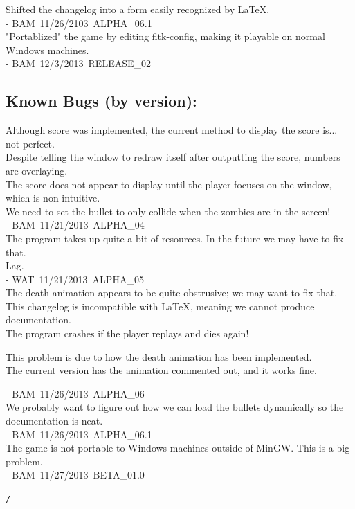 \documentclass[12pt]{article}
\begin{document}
   \noindent
   Shifted the changelog into a form easily recognized by {\LaTeX}. \\
   	- BAM\, 11/26/2103\, ALPHA\_06.1 \\
   
   \noindent
   "Portablized" the game by editing fltk-config, making it playable on normal Windows machines. \\
   	- BAM\, 12/3/2013\, RELEASE\_02 \\
   
   \subsection{Known Bugs (by version):}
   
   Although score was implemented, the current method to display the score is... not perfect. \\
   	Despite telling the window to redraw itself after outputting the score, numbers are overlaying. \\
   	The score does not appear to display until the player focuses on the window, which is non-intuitive. \\
   	We need to set the bullet to only collide when the zombies are in the screen! \\
   	- BAM\, 11/21/2013\, ALPHA\_04 \\
   
   \noindent
   The program takes up quite a bit of resources. In the future we may have to fix that. \\
   	Lag. \\
   	- WAT\, 11/21/2013\, ALPHA\_05 \\
   
   \noindent
   The death animation appears to be quite obstrusive; we may want to fix that. \\
   	This changelog is incompatible with {\LaTeX}, meaning we cannot produce documentation. \\
   	The program crashes if the player replays and dies again!
   		\begin{itemize}
   		This problem is due to how the death animation has been implemented. \\
   		The current version has the animation commented out, and it works fine. \\
   		\end{itemize}
   	- BAM\, 11/26/2013\, ALPHA\_06 \\
   
   \noindent
   We probably want to figure out how we can load the bullets dynamically so the documentation is neat. \\
   	- BAM\, 11/26/2013\, ALPHA\_06.1 \\
   
   \noindent
   The game is not portable to Windows machines outside of MinGW. This is a big problem. \\
   	- BAM\, 11/27/2013\, BETA\_01.0 
   
    \rm\mc 

\noindent
{\tt *}{\tt /}
\tt\mc 

\noindent
{}\tt\mc {\tt /}{\tt /}

\noindent


\rm\mc
\end{document}
